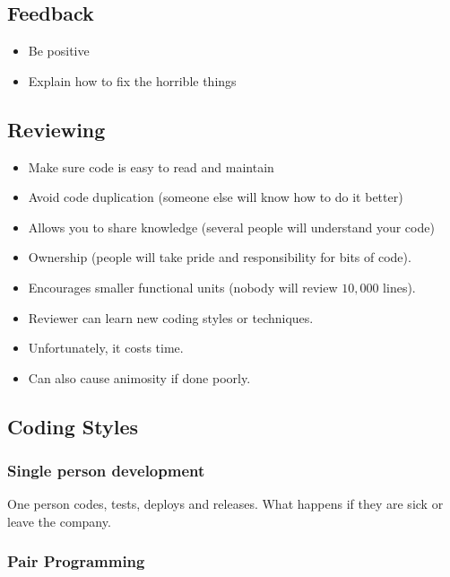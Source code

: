 \subsection{Feedback}\label{sub:feedback}

\begin{itemize}
    \item Be positive
    \item Explain how to fix the horrible things
\end{itemize}

\subsection{Reviewing}\label{sub:reviewing}

\begin{itemize}
    \item Make sure code is easy to read and maintain
    \item Avoid code duplication (someone else will know how to do it better)
    \item Allows you to share knowledge (several people will understand your code)
    \item Ownership (people will take pride and responsibility for bits of code).
    \item Encourages smaller functional units (nobody will review \(10,000\) lines).
    \item Reviewer can learn new coding styles or techniques.
    \item Unfortunately, it costs time.
    \item Can also cause animosity if done poorly.
\end{itemize}

\subsection{Coding Styles}\label{sub:coding_styles}

\subsubsection{Single person development}\label{ssub:single_person_development}

One person codes, tests, deploys and releases.
What happens if they are sick or leave the company.

\subsubsection{Pair Programming}\label{ssub:pair_programming}

